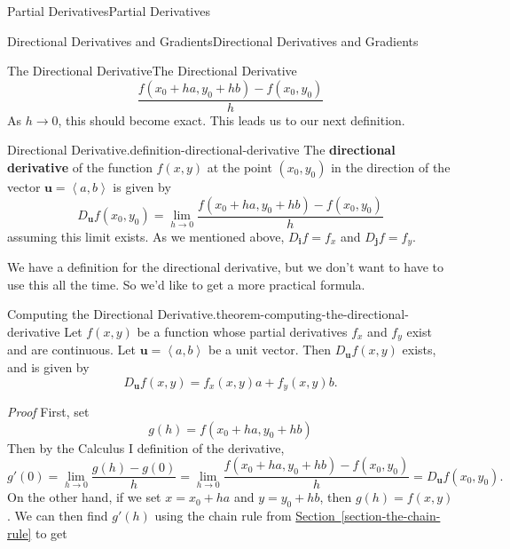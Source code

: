 \documentclass[10pt,]{book}
\makeatletter
\newcommand{\terminology}[1]{\textbf{#1}}
\renewcommand*{\proofname}{Proof}
\renewenvironment{proof}[1][\proofname]{\par
  \pushQED{\qed}%
  \normalfont \topsep6\p@\@plus6\p@\relax
  \trivlist
  \item\relax
    {\itshape
    #1\@addpunct{.}}\hspace\labelsep\ignorespaces
}{%
  \popQED\endtrivlist\@endpefalse
}
\numberwithin{equation}{section}
\newcommand{\vv}[1]{\mathbf{#1}}
\newcommand{\dotprod}[1]{\left\langle #1 \right\rangle}
\makeatother
\begin{document}
\begin{chapterptx}{Partial Derivatives}{}{Partial Derivatives}{}{}
\begin{sectionptx}{Directional Derivatives and Gradients}{}{Directional Derivatives and Gradients}{}{}
\begin{subsectionptx}{The Directional Derivative}{}{The Directional Derivative}{}{}
\begin{equation*}
\frac{f(x_{0}+ha, y_{0} + hb) - f(x_{0},y_{0})}{h}
\end{equation*}
As \(h\to0\), this should become exact. This leads us to our next definition.%
\begin{definition}{Directional Derivative.}{definition-directional-derivative}%
\hypertarget{p-1180}{}%
The \terminology{directional derivative} of the function \(f(x,y)\) at the point \((x_{0},y_{0})\) in the direction of the vector \(\vv{u} = \dotprod{a,b}\) is given by%
\begin{equation*}
D_{\vv{u}}f(x_{0},y_{0}) = \lim_{h\to0}\frac{f(x_{0}+ha, y_{0} + hb) - f(x_{0},y_{0})}{h}
\end{equation*}
assuming this limit exists. As we mentioned above, \(D_{\vv{i}}f = f_{x}\) and \(D_{\vv{j}}f = f_{y}\).%
\end{definition}
\hypertarget{p-1181}{}%
We have a definition for the directional derivative, but we don't want to have to use this all the time. So we'd like to get a more practical formula.%
\begin{theorem}{Computing the Directional Derivative.}{}{theorem-computing-the-directional-derivative}%
\hypertarget{p-1182}{}%
Let \(f(x,y)\) be a function whose partial derivatives \(f_{x}\) and \(f_{y}\) exist and are continuous. Let \(\vv{u} = \dotprod{a,b}\) be a unit vector. Then \(D_{\vv{u}}f(x,y)\) exists, and is given by%
\begin{equation*}
D_{\vv{u}}f(x,y) = f_{x}(x,y)a + f_{y}(x,y)b.
\end{equation*}
%
\end{theorem}
\begin{proof}\hypertarget{proof-14}{}
\hypertarget{p-1183}{}%
First, set%
\begin{equation*}
g(h) = f(x_{0}+ha, y_{0} +hb)
\end{equation*}
Then by the Calculus I definition of the derivative,%
\begin{equation*}
g'(0) = \lim_{h\to0}\frac{g(h) - g(0)}{h} = \lim_{h\to0}\frac{f(x_{0}+ha, y_{0}+hb) - f(x_{0},y_{0})}{h} = D_{\vv{u}}f(x_{0},y_{0}).
\end{equation*}
On the other hand, if we set \(x = x_{0} + ha\) and \(y = y_{0} + hb\), then \(g(h) = f(x,y)\). We can then find \(g'(h)\) using the chain rule from \hyperref[section-the-chain-rule]{Section~\ref{section-the-chain-rule}} to get%
\begin{equation*}

\end{equation*}
\end{proof}
\end{subsectionptx}
\end{sectionptx}
\end{chapterptx}
\end{document}
